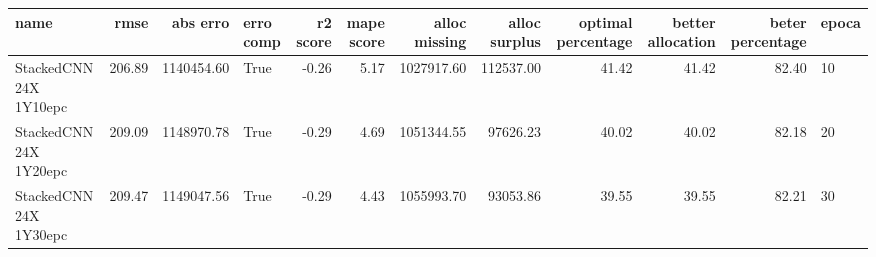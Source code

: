 \begin{tabular}{lrrlrrrrrrrl}
\toprule
name & rmse & abs erro & erro comp & r2 score & mape score & alloc missing & alloc surplus & optimal percentage & better allocation & beter percentage & epoca \\
\midrule
StackedCNN 24X 1Y10epc & 206.89 & 1140454.60 & True & -0.26 & 5.17 & 1027917.60 & 112537.00 & 41.42 & 41.42 & 82.40 & 10 \\
StackedCNN 24X 1Y20epc & 209.09 & 1148970.78 & True & -0.29 & 4.69 & 1051344.55 & 97626.23 & 40.02 & 40.02 & 82.18 & 20 \\
StackedCNN 24X 1Y30epc & 209.47 & 1149047.56 & True & -0.29 & 4.43 & 1055993.70 & 93053.86 & 39.55 & 39.55 & 82.21 & 30 \\
\bottomrule
\end{tabular}
